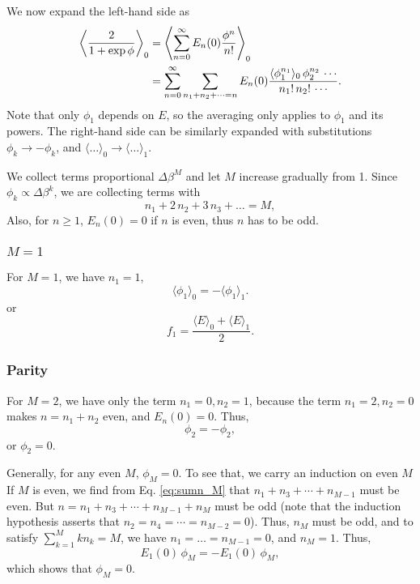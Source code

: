 \documentclass[aip,jcp,preprint,notitlepage, superscriptaddress]{revtex4-1}
\begin{document}
We now expand the left-hand side as
%
\begin{align*}
\left\langle
  \frac{ 2 }
  { 1 + \exp \phi  }
\right\rangle_0
&=
\left\langle
\sum_{n = 0}^\infty
E_n(0) \frac{ \phi^n } { n! }
\right\rangle_0
\notag \\
&=
\sum_{n = 0}^\infty
\sum_{n_1 + n_2 + \dots = n}
E_n(0)
\frac{ \langle \phi_1^{n_1} \rangle_0 \,
      \phi_2^{n_2} \, \cdots } { n_1! \, n_2! \, \cdots }.
\end{align*}
%
Note that only $\phi_1$ depends on $E$,
so the averaging only applies to $\phi_1$ and its powers.
%
The right-hand side
can be similarly expanded
with substitutions
$\phi_k \rightarrow -\phi_k$,
and
$\langle \dots \rangle_0 \rightarrow \langle \dots \rangle_1$.



We collect terms proportional $\Delta \beta^M$
and let $M$ increase gradually from 1.
%
Since $\phi_k \propto \Delta \beta^k$,
we are collecting terms with
\begin{equation}
n_1 + 2 \, n_2 + 3 \, n_3 + \dots = M,
\label{eq:sumn_M}
\end{equation}
Also,
for $n \ge 1$,
$E_n(0) = 0$ if $n$ is even,
thus $n$ has to be odd.



\subsubsection{$M = 1$}



For $M = 1$,
we have $n_1 = 1$,
\[
\langle \phi_1 \rangle_0
=
-\langle \phi_1 \rangle_1.
\]
or
\[
f_1 =
\frac{
  \langle E \rangle_0
  +
  \langle E \rangle_1
}{ 2 }.
\]



\subsubsection{Parity}



For $M = 2$,
we have only the term $n_1 = 0, n_2 = 1$,
because the term $n_1 = 2, n_2 = 0$
makes $n = n_1 + n_2$ even,
and $E_n(0) = 0$.
%
Thus,
\[
\phi_2
=
-\phi_2,
\]
or $\phi_2 = 0$.



Generally,
for any even $M$,
$\phi_M = 0$.
%
To see that, we carry an induction on even $M$
%
If $M$ is even,
we find from Eq. \eqref{eq:sumn_M} that
$n_1 + n_3 + \cdots + n_{M - 1}$ must be even.
But
$n = n_1 + n_3 + \cdots + n_{M - 1} + n_M$
must be odd
(note that the induction hypothesis asserts
that $n_2 = n_4 = \cdots = n_{M-2} = 0$).
%
Thus, $n_M$ must be odd,
and to satisfy $\sum_{k = 1}^M k n_k = M$,
we have $n_1 = \dots = n_{M-1} = 0$,
and $n_M = 1$.
%
Thus,
%
\[
E_1(0) \, \phi_M
=
-E_1(0) \, \phi_M,
\]
which shows that $\phi_M = 0$.
\end{document}
